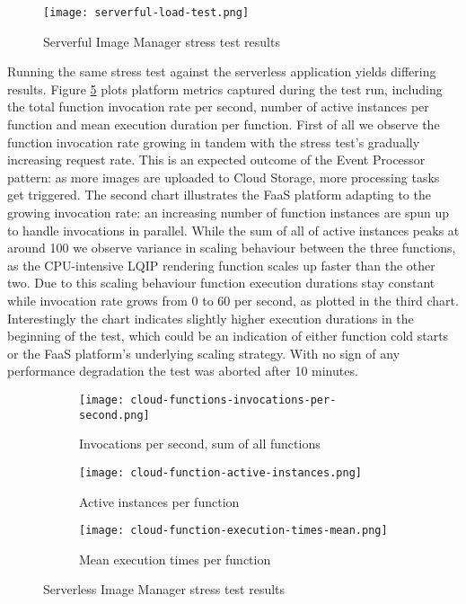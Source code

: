 \begin{figure}[h]
  \centering
  \texttt{[image: serverful-load-test.png]}
  \caption{Serverful Image Manager stress test results}
  \label{fig:serverfulStressTest}
\end{figure}

Running the same stress test against the serverless application yields differing results. Figure \ref{fig:serverlessStressTest} plots platform metrics captured during the test run, including the total function invocation rate per second, number of active instances per function and mean execution duration per function. First of all we observe the function invocation rate growing in tandem with the stress test's gradually increasing request rate. This is an expected outcome of the Event Processor pattern: as more images are uploaded to Cloud Storage, more processing tasks get triggered. The second chart illustrates the FaaS platform adapting to the growing invocation rate: an increasing number of function instances are spun up to handle invocations in parallel. While the sum of all of active instances peaks at around 100 we observe variance in scaling behaviour between the three functions, as the CPU-intensive LQIP rendering function scales up faster than the other two. Due to this scaling behaviour function execution durations stay constant while invocation rate grows from 0 to 60 per second, as plotted in the third chart. Interestingly the chart indicates slightly higher execution durations in the beginning of the test, which could be an indication of either function cold starts or the FaaS platform's underlying scaling strategy. With no sign of any performance degradation the test was aborted after 10 minutes.

\begin{figure}[h]
  \centering
  \begin{subfigure}[b]{0.75\textwidth}
      \texttt{[image: cloud-functions-invocations-per-second.png]}
      \caption{Invocations per second, sum of all functions}
      \label{fig:tiger}
  \end{subfigure}

  \begin{subfigure}[b]{0.75\textwidth}
      \texttt{[image: cloud-function-active-instances.png]}
      \caption{Active instances per function}
      \label{fig:gull}
  \end{subfigure}

  \begin{subfigure}[b]{0.75\textwidth}
      \texttt{[image: cloud-function-execution-times-mean.png]}
      \caption{Mean execution times per function}
      \label{fig:mouse}
  \end{subfigure}
  \caption{Serverless Image Manager stress test results}\label{fig:serverlessStressTest}
\end{figure}

